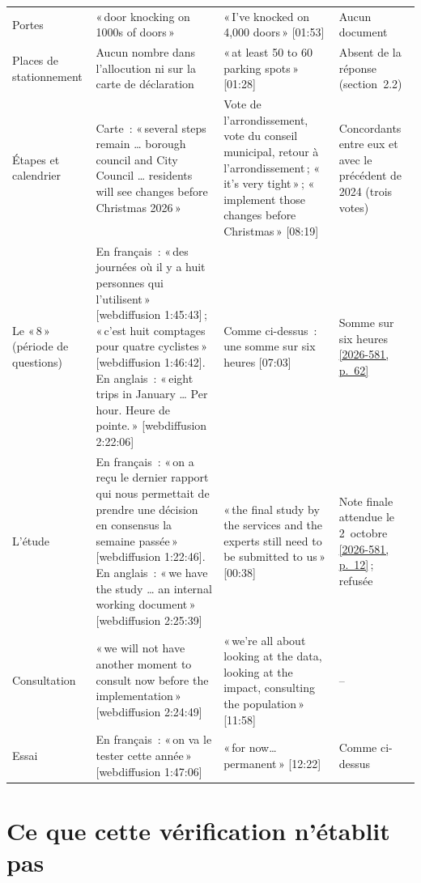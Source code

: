 \documentclass[11pt,letterpaper]{article}
\newcommand{\pagesurl}{https://openmobilitydata.github.io/Terrebonne-access-requests}
\newcommand{\cliptime}[1]{\textsf{\small[#1]}}
\newcommand{\wctime}[1]{\textsf{\small[webdiffusion #1]}}
\newcommand{\pgl}[2]{\href{\pagesurl/2026-581/raw/01_emails_mandate_counts.pdf\#page=#1}{\textsf{\small[2026-581, p.~#2]}}}
\newcommand{\pg}[1]{\pgl{#1}{#1}}
\newif\ifqa\qatrue
\begin{document}
\begin{small}
\begin{longtable}{>{\raggedright\arraybackslash}p{2.2cm}>{\raggedright\arraybackslash}p{4.4cm}>{\raggedright\arraybackslash}p{4.4cm}>{\raggedright\arraybackslash}p{3.6cm}}
\addlinespace
Portes & «\,door knocking on 1000s of doors\,» & «\,I've knocked on 4,000 doors\,» \cliptime{01:53} & Aucun document \\
\addlinespace
Places de stationnement & Aucun nombre dans l'allocution ni sur la carte de déclaration & «\,at least 50 to 60 parking spots\,» \cliptime{01:28} & Absent de la réponse (section~2.2) \\
\addlinespace
Étapes et calendrier & Carte~: «\,several steps remain … borough council and City Council … residents will see changes before Christmas 2026\,» & Vote de l'arrondissement, vote du conseil municipal, retour à l'arrondissement\,; «\,it's very tight\,»\,; «\,implement those changes before Christmas\,» \cliptime{08:19} & Concordants entre eux et avec le précédent de 2024 (trois votes) \\
\ifqa
\addlinespace
Le «\,8\,» (période de questions) & En français~: «\,des journées où il y a huit personnes qui l'utilisent\,» \wctime{1:45:43}\,; «\,c'est huit comptages pour quatre cyclistes\,» \wctime{1:46:42}. En anglais~: «\,eight trips in January … Per hour. Heure de pointe.\,» \wctime{2:22:06} & Comme ci-dessus~: une somme sur six heures \cliptime{07:03} & Somme sur six heures \pg{62} \\
\addlinespace
L'étude & En français~: «\,on a reçu le dernier rapport qui nous permettait de prendre une décision en consensus la semaine passée\,» \wctime{1:22:46}. En anglais~: «\,we have the study … an internal working document\,» \wctime{2:25:39} & «\,the final study by the services and the experts still need to be submitted to us\,» \cliptime{00:38} & Note finale attendue le 2~octobre \pg{12}\,; refusée \\
\addlinespace
Consultation & «\,we will not have another moment to consult now before the implementation\,» \wctime{2:24:49} & «\,we're all about looking at the data, looking at the impact, consulting the population\,» \cliptime{11:58} & -- \\
\addlinespace
Essai & En français~: «\,on va le tester cette année\,» \wctime{1:47:06} & «\,for now… permanent\,» \cliptime{12:22} & Comme ci-dessus \\
\fi
\bottomrule
\end{longtable}
\end{small}

\section{Ce que cette vérification n'établit pas}
\end{document}
